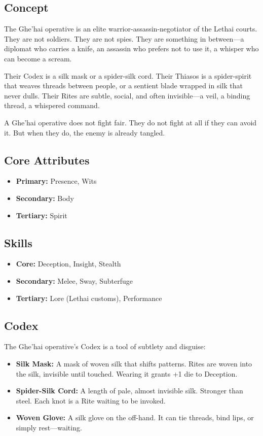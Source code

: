 \subsection{Concept}

The Ghe'hai operative is an elite warrior-assassin-negotiator of the Lethai courts. They are not soldiers. They are not spies. They are something in between—a diplomat who carries a knife, an assassin who prefers not to use it, a whisper who can become a scream.

Their Codex is a silk mask or a spider-silk cord. Their Thiasos is a spider-spirit that weaves threads between people, or a sentient blade wrapped in silk that never dulls. Their Rites are subtle, social, and often invisible—a veil, a binding thread, a whispered command.

A Ghe'hai operative does not fight fair. They do not fight at all if they can avoid it. But when they do, the enemy is already tangled.

\subsection{Core Attributes}

\begin{itemize}
\item \textbf{Primary:} Presence, Wits
\item \textbf{Secondary:} Body
\item \textbf{Tertiary:} Spirit
\end{itemize}

\subsection{Skills}

\begin{itemize}
\item \textbf{Core:} Deception, Insight, Stealth
\item \textbf{Secondary:} Melee, Sway, Subterfuge
\item \textbf{Tertiary:} Lore (Lethai customs), Performance
\end{itemize}

\subsection{Codex}

The Ghe'hai operative's Codex is a tool of subtlety and disguise:

\begin{itemize}
\item \textbf{Silk Mask:} A mask of woven silk that shifts patterns. Rites are woven into the silk, invisible until touched. Wearing it grants +1 die to Deception.
\item \textbf{Spider-Silk Cord:} A length of pale, almost invisible silk. Stronger than steel. Each knot is a Rite waiting to be invoked.
\item \textbf{Woven Glove:} A silk glove on the off-hand. It can tie threads, bind lips, or simply rest—waiting.
\end{itemize}

